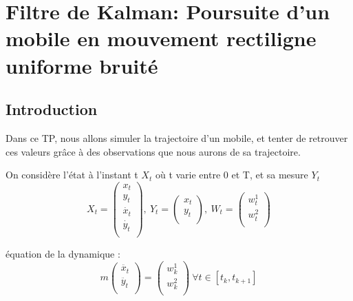 \documentclass{article}
\begin{document}
\newpage
\section{Filtre de Kalman: Poursuite d'un mobile en mouvement rectiligne uniforme bruité}
\subsection{Introduction}
Dans ce TP, nous allons simuler la trajectoire d'un mobile, et tenter de retrouver ces valeurs grâce à des observations que nous aurons de sa trajectoire.

On considère l'état à l'instant t $X_t$ où t varie entre 0 et T, et sa mesure $Y_t$
\[ X_t = \left (
   \begin{array}{c}
      x_t \\
      y_t \\
      \Dot{x_t} \\
      \Dot{y_t} \\
   \end{array} \right )
   ,\ Y_t = \left (
   \begin{array}{c}
      x_t \\
      y_t \\
   \end{array} \right )
   ,\ W_t = \left (
   \begin{array}{c}
      w_t^1 \\
      w_t^2 \\
   \end{array} \right )
\]

équation de la dynamique : 
\[ m \left (
   \begin{array}{c}
      \ddot{x_t} \\
      \ddot{y_t} \\
   \end{array} \right )
   = \left (
   \begin{array}{c}
      w_k^1 \\
      w_k^2 \\
   \end{array} \right )\ 
   \forall t \in [t_k, t_{k+1}]
\]
\end{document}
